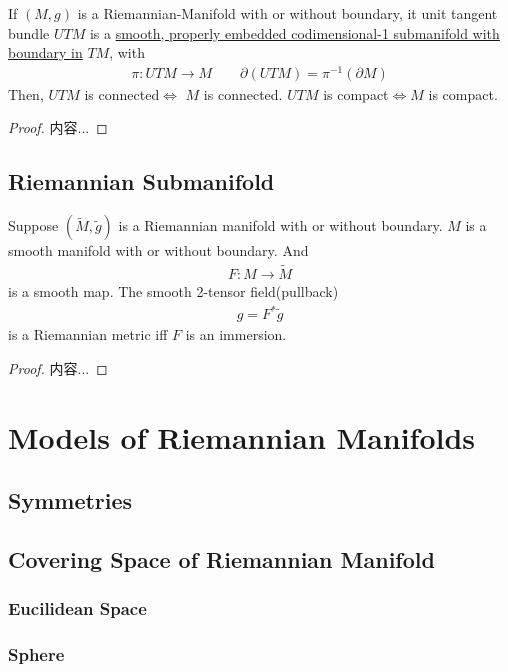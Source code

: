 \documentclass[Total.tex]{subfiles}
\begin{document}
				\begin{proposition}
					If $(M,g)$ is a Riemannian-Manifold with or without boundary, it unit tangent bundle $UTM$ is a \underline{smooth, properly embedded codimensional-1 submanifold with boundary in} $TM$, with
					\begin{gather*}
						\pi:UTM\rightarrow M\qquad \partial(UTM)=\pi^{-1}(\partial M)
					\end{gather*}
					Then, $UTM$ is connected$\Leftrightarrow$ $M$ is connected. $UTM$ is compact$\Leftrightarrow M$ is compact. 
				\end{proposition}
				\begin{proof}
					内容...
				\end{proof}
			\subsection{Riemannian Submanifold}
				\begin{lemma}
					Suppose $(\tilde{M},\tilde{g})$ is a Riemannian manifold with or without boundary. $M$ is a smooth manifold with or without boundary. And 
					\begin{gather*}
						F:M\rightarrow \tilde{M}
					\end{gather*}
					is a smooth map. The smooth 2-tensor field(pullback)
					\begin{gather*}
						g=F^*\tilde{g}
					\end{gather*}
					is a Riemannian metric iff $F$ is an immersion.
				\end{lemma}
				\begin{proof}
					内容...
				\end{proof}
		\section{Models of Riemannian Manifolds}
			\subsection{Symmetries}
			\subsection{Covering Space of Riemannian Manifold}	 
				
				\subsubsection{Eucilidean Space}
				\subsubsection{Sphere}
\end{document}
